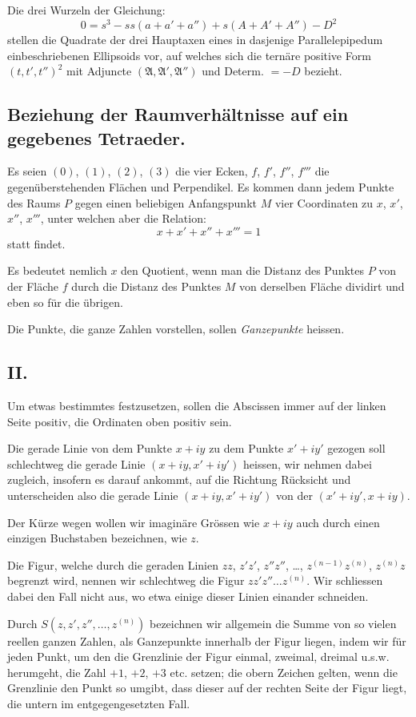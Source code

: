 \documentclass[12pt,a4paper]{article}
\begin{document}
Die drei Wurzeln der Gleichung:
\[
0 = s^3 - ss(a + a' + a'') + s(A + A' + A'') - D^2
\]
stellen die Quadrate der drei Hauptaxen eines in dasjenige Parallelepipedum einbeschriebenen
Ellipsoids vor, auf welches sich die ternäre positive Form $(t, t', t'')^2$ mit Adjuncte
$(\mathfrak{A}, \mathfrak{A}', \mathfrak{A}'')$ und Determ. $= -D$ bezieht.


\subsection*{Beziehung der Raumverhältnisse auf ein gegebenes Tetraeder.}

Es seien $(0)$, $(1)$, $(2)$, $(3)$ die vier Ecken, $f$, $f'$, $f''$, $f'''$ die gegenüberstehenden Flächen und
Perpendikel. Es kommen dann jedem Punkte des Raums $P$ gegen einen beliebigen Anfangspunkt $M$
vier Coordinaten zu $x$, $x'$, $x''$, $x'''$, unter welchen aber die Relation:
\[
x + x' + x'' + x''' = 1
\]
statt findet.

Es bedeutet nemlich $x$ den Quotient, wenn man die Distanz des Punktes $P$ von der Fläche $f$
durch die Distanz des Punktes $M$ von derselben Fläche dividirt und eben so für die übrigen.

Die Punkte, die ganze Zahlen vorstellen, sollen \textit{Ganzepunkte} heissen.

\subsection*{II.}

Um etwas bestimmtes festzusetzen, sollen die Abscissen immer auf der linken Seite positiv,
die Ordinaten oben positiv sein.

Die gerade Linie von dem Punkte $x + iy$ zu dem Punkte $x' + iy'$ gezogen soll schlechtweg
die gerade Linie $(x + iy, x' + iy')$ heissen, wir nehmen dabei zugleich, insofern es darauf ankommt,
auf die Richtung Rücksicht und unterscheiden also die gerade Linie $(x + iy, x' + iy')$ von der
$(x' + iy', x + iy)$.

Der Kürze wegen wollen wir imaginäre Grössen wie $x + iy$ auch durch einen einzigen Buchstaben
bezeichnen, wie $z$.

Die Figur, welche durch die geraden Linien $zz$, $z'z'$, $z''z''$, \ldots{}, $z^{(n-1)}z^{(n)}$, $z^{(n)}z$ begrenzt wird,
nennen wir schlechtweg die Figur $zz'z''\ldots z^{(n)}$. Wir schliessen dabei den Fall nicht aus, wo
etwa einige dieser Linien einander schneiden.

Durch $S(z, z', z'', \ldots, z^{(n)})$ bezeichnen wir allgemein die Summe von so vielen reellen ganzen
Zahlen, als Ganzepunkte innerhalb der Figur liegen, indem wir für jeden Punkt, um den die
Grenzlinie der Figur einmal, zweimal, dreimal u.s.w. herumgeht, die Zahl $+1$, $+2$, $+3$ etc.
setzen; die obern Zeichen gelten, wenn die Grenzlinie den Punkt so umgibt, dass dieser auf der
rechten Seite der Figur liegt, die untern im entgegengesetzten Fall.
\end{document}
